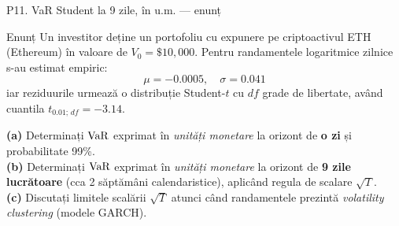 \documentclass[9pt, aspectratio=169, t]{beamer}
\begin{document}
\begin{frame}{P11. VaR Student la 9 zile, în u.m. --- enunț}
\begin{block}{Enunț}
Un investitor deține un portofoliu cu expunere pe criptoactivul ETH (Ethereum) în valoare de $V_0=\$10{,}000$. Pentru randamentele logaritmice zilnice s-au estimat empiric:
\[
\mu = -0.0005,\quad \sigma = 0.041
\]
iar reziduurile urmează o distribuție Student-$t$ cu $df$ grade de libertate, având cuantila $t_{0.01;\,df} = -3.14$.

\textbf{(a)} Determinați $\text{VaR}$ exprimat în \emph{unități monetare} la orizont de \textbf{o zi} și probabilitate 99\%.\\
\textbf{(b)} Determinați $\text{VaR}$ exprimat în \emph{unități monetare} la orizont de \textbf{9 zile lucrătoare} (cca 2 săptămâni calendaristice), aplicând regula de scalare $\sqrt T$.\\
\textbf{(c)} Discutați limitele scalării $\sqrt T$ atunci când randamentele prezintă \emph{volatility clustering} (modele GARCH).
\end{block}
\end{frame}
\end{document}
